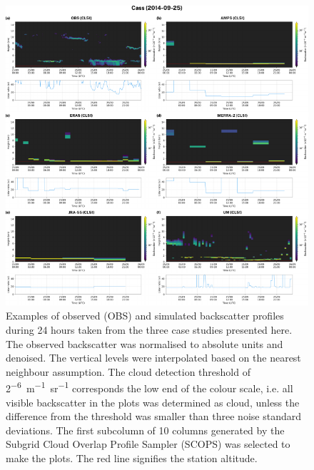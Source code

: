 \begin{figure}[p]
\centering
\includegraphics[width=\textwidth]{chapter3/fig/examples.pdf}
\caption[Examples of observed and simulated backscatter profiles]{
Examples of observed (OBS) and simulated backscatter profiles during 24 hours
taken from the three case studies presented here. The observed backscatter
was normalised to absolute units and denoised.
The vertical levels were interpolated based on the
nearest neighbour assumption. The cloud detection threshold of 2\unit{^{-6} m^{-1}sr^{-1}}
corresponds the low end of the colour scale, i.e. all visible backscatter
in the plots was determined as cloud, unless the difference from the threshold
was smaller than three noise standard deviations. The first subcolumn of
10 columns generated by the Subgrid Cloud Overlap Profile Sampler (SCOPS)
was selected to make the plots. The red line signifies the station altitude.
}
\label{fig:3:examples}
\end{figure}

